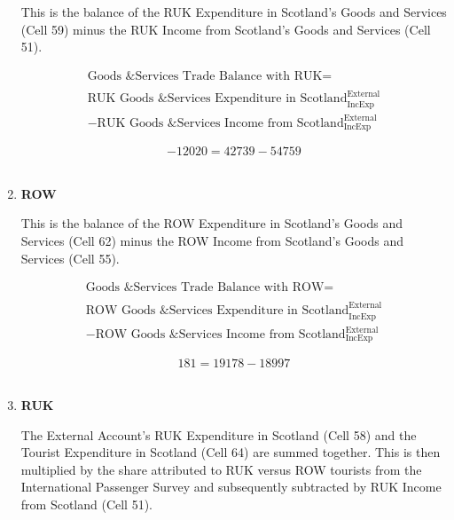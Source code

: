 \begin{enumerate}
This is the balance of the RUK Expenditure in Scotland's Goods and Services (Cell 59) minus the RUK Income from Scotland's Goods and Services (Cell 51).

\begin{equation}
\begin{split}
\text{Goods \& Services Trade Balance with RUK} =  \\ \\ 
\text{RUK Goods \& Services Expenditure in Scotland}^\text{External}_\text{IncExp}\\
-\text{RUK Goods \& Services Income from Scotland}^\text{External}_\text{IncExp}
\end{split} \label{eq:2.5.71}
\end{equation}

\begin{equation} \nonumber
-12020 = 42739-54759
\end{equation}\\


\item \textbf {ROW}

This is the balance of the ROW Expenditure in Scotland's Goods and Services (Cell 62) minus the ROW Income from Scotland's Goods and Services (Cell 55).

\begin{equation}
\begin{split}
\text{Goods \& Services Trade Balance with ROW} =  \\ \\ 
\text{ROW Goods \& Services Expenditure in Scotland}^\text{External}_\text{IncExp}\\
-\text{ROW Goods \& Services Income from Scotland}^\text{External}_\text{IncExp}
\end{split} \label{eq:2.5.72}
\end{equation}

\begin{equation} \nonumber
181 = 19178-18997
\end{equation}\\



\pagebreak

\item \textbf {RUK}

The External Account's RUK Expenditure in Scotland (Cell 58) and the Tourist Expenditure in Scotland (Cell 64) are summed together. This is then multiplied by the share attributed to RUK versus ROW tourists from the International Passenger Survey \cite{ONS2010a} and subsequently subtracted by RUK Income from Scotland (Cell 51).\\


\end{enumerate}
